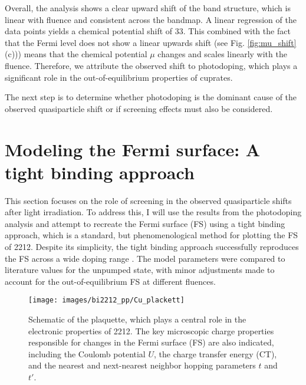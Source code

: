 Overall, the analysis shows a clear upward shift of the band structure, which is linear with fluence and consistent across the bandmap.
A linear regression of the data points yields a chemical potential shift of \qty{33}{\frac{\milli\electronvolt}{\milli\joule/\centi\meter\squared}}.
This combined with the fact that the Fermi level does not show a linear upwards shift (see Fig. \ref{fig:mu_shift} (c))) means that the chemical potential $\mu$ changes and scales linearly with the fluence.
Therefore, we attribute the observed shift to photodoping, which plays a significant role in the out-of-equilibrium properties of cuprates.

The next step is to determine whether photodoping is the dominant cause of the observed quasiparticle shift or if screening effects must also be considered.

\section{Modeling the Fermi surface: A tight binding approach}
\label{sec:tb}

This section focuses on the role of screening in the observed quasiparticle shifts after light irradiation.
To address this, I will use the results from the photodoping analysis and attempt to recreate the Fermi surface (FS) using a tight binding approach, which is a standard, but phenomenological method for plotting the FS of 2212.
Despite its simplicity, the tight binding approach successfully reproduces the FS across a wide doping range \cite{markiewicz_one-band_2005}.
The model parameters were compared to literature values for the unpumped state, with minor adjustments made to account for the out-of-equilibrium FS at different fluences.

\begin{figure}
	\centering
	\texttt{[image: images/bi2212\_pp/Cu\_plackett]}
	\caption{Schematic of the  plaquette, which plays a central role in the electronic properties of 2212. The key microscopic charge properties responsible for changes in the Fermi surface (FS) are also indicated, including the Coulomb potential $U$, the charge transfer energy (CT), and the nearest and next-nearest neighbor hopping parameters $t$ and $t'$.}
	\label{fig:cuplackett}
\end{figure}

